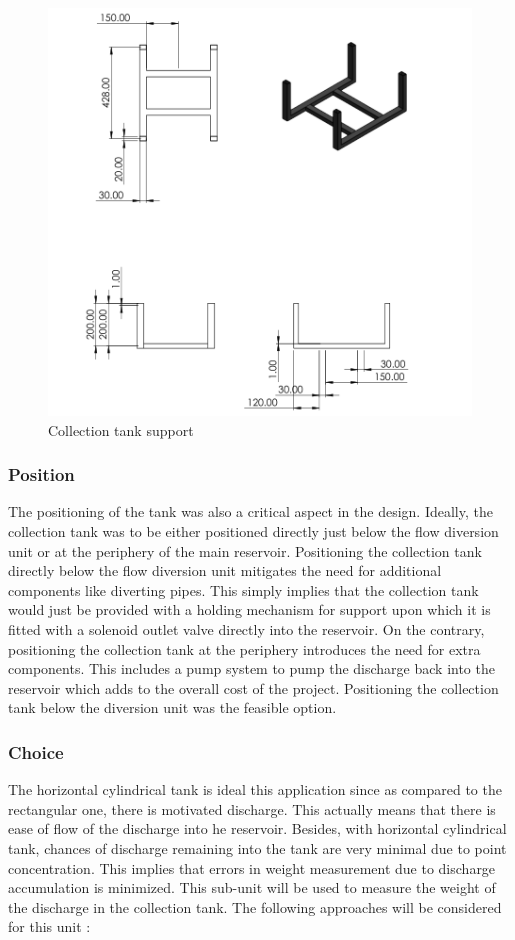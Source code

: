\begin{figure}[ht]
\includegraphics[width=0.9\linewidth]{Figures/Collection tank support.png}
\centering
\caption{Collection tank support }
\label{fig:Collection tank support}
\end{figure}

\subsubsection{Position}
\par
The positioning of the tank was also a critical aspect in the design. Ideally, the collection tank was to be either positioned directly just below the flow diversion unit or at the periphery of the main reservoir. Positioning the collection tank directly below the flow diversion unit mitigates the need for additional components like diverting pipes. This simply implies that the collection tank would just be provided with a holding mechanism for support upon which it is fitted with a solenoid outlet valve directly into the reservoir. On the contrary, positioning the collection tank at the periphery introduces the need for extra components. This includes a pump system to pump the discharge back into the reservoir which adds to the overall cost of the project. Positioning the collection tank below the diversion unit was the feasible option.
\par


\subsubsection{Choice}
\par
The horizontal cylindrical tank is ideal this application since as compared to the rectangular one, there is motivated discharge. This actually means that there is ease of flow of the discharge into he reservoir. Besides, with horizontal cylindrical tank, chances of discharge remaining into the tank are very minimal due to point concentration. This implies that errors in weight measurement due to discharge accumulation is minimized.
This sub-unit will be used to measure the weight of the discharge in the collection tank. The following approaches will be considered for this unit :

